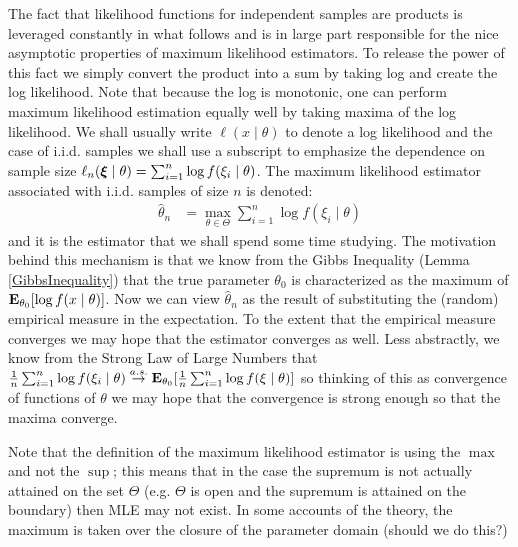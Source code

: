 The fact that likelihood functions for independent samples are products
is leveraged constantly in what follows and is in large part
responsible for the nice asymptotic properties of maximum likelihood
estimators.  To release the power of this fact we simply convert the
product into a sum by taking log and create the log likelihood.  Note that because the log is
monotonic, one can perform maximum likelihood estimation equally well
by taking maxima of the log likelihood.  We shall usually write
$\ell(x \mid \theta)$ to denote a log likelihood and the case of
i.i.d. samples we shall use a subscript to emphasize the
dependence on sample size $\ell_n(\sample{\xi} \mid \theta) =
\sum_{i=1}^n\log f(\xi_i \mid \theta)$.  The maximum likelihood estimator
associated with i.i.d. samples of size $n$ is denoted:
\begin{align*}
\hat{\theta}_n &= \max_{\theta \in \Theta} \sum_{i=1}^n \log f(\xi_i \mid \theta)
\end{align*}
and it is the estimator that we shall spend some time studying.  The
motivation behind this mechanism is that we know from the Gibbs
Inequality (Lemma \ref{GibbsInequality}) that the true parameter
$\theta_0$ is characterized as the maximum of $\sexpectation{\log f(x
  \mid \theta)}{\theta_0}$.  Now we can view $\hat{\theta}_n$ as the
result of substituting the (random) empirical measure in the
expectation.  To the extent that the empirical measure converges we
may hope that the estimator converges as well.  Less abstractly, we
know from the Strong Law of Large Numbers that
$\frac{1}{n}\sum_{i=1}^n \log f(\xi_i \mid \theta) \toas
\sexpectation{\frac{1}{n}\sum_{i=1}^n \log f(\xi \mid
  \theta)}{\theta_0}$ so thinking of this as convergence of functions
of $\theta$ we may hope that the convergence is strong enough so that
the maxima converge.

Note that the definition of the maximum likelihood estimator is using
the $\max$ and not the $\sup$; this means that in the case the
supremum is not actually attained on the set $\Theta$ (e.g. $\Theta$
is open and the supremum is attained on the boundary) then MLE may not
exist.  In some accounts of the theory, the maximum is taken over the
closure of the parameter domain (should we do this?)

